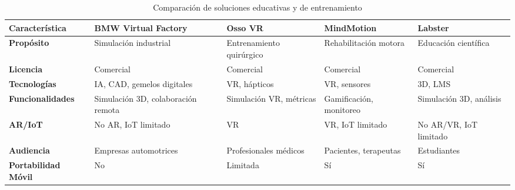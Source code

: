 \documentclass[12pt,letterpaper]{report}
\begin{document}
	\begin{table}[H]
		\centering
		\caption{Comparación de soluciones educativas y de entrenamiento}
		\label{tab:comparacion_plataformas_educativas}
		\scriptsize
		\begin{tabular}{|>{\centering\arraybackslash}p{2.8cm}|>{\centering\arraybackslash}p{2.8cm}|>{\centering\arraybackslash}p{2.8cm}|>{\centering\arraybackslash}p{2.8cm}|>{\centering\arraybackslash}p{2.8cm}|}
			\hline
			\textbf{Característica} & \textbf{BMW Virtual Factory} & \textbf{Osso VR} & \textbf{MindMotion} & \textbf{Labster} \\
			\hline
			\textbf{Propósito} & Simulación industrial & Entrenamiento quirúrgico & Rehabilitación motora & Educación científica \\
			\hline
			\textbf{Licencia} & Comercial & Comercial & Comercial & Comercial \\
			\hline
			\textbf{Tecnologías} & IA, CAD, gemelos digitales & VR, hápticos & VR, sensores & 3D, LMS \\
			\hline
			\textbf{Funcionalidades} & Simulación 3D, colaboración remota & Simulación VR, métricas & Gamificación, monitoreo & Simulación 3D, análisis \\
			\hline
			\textbf{AR/IoT} & No AR, IoT limitado & VR & VR, IoT limitado & No AR/VR, IoT limitado \\
			\hline
			\textbf{Audiencia} & Empresas automotrices & Profesionales médicos & Pacientes, terapeutas & Estudiantes \\
			\hline
			\textbf{Portabilidad Móvil} & No & Limitada & Sí & Sí \\
			\hline
		\end{tabular}
	\end{table}
	
\end{document}

